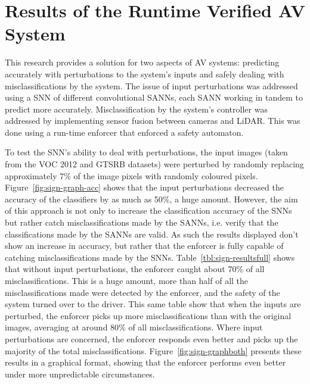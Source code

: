 \section{Results of the Runtime Verified AV System}

This research provides a solution for two aspects of \acf{AV} systems: predicting accurately with perturbations to the system's inputs and safely dealing with misclassifications by the system.
The issue of input perturbations was addressed using a \acf{SNN} of different convolutional \acfp{SANN}, each \ac{SANN} working in tandem to predict more accurately.
Misclassification by the system's controller was addressed by implementing sensor fusion between cameras and \ac{LiDAR}.
This was done using a run-time enforcer that enforced a safety automaton.

To test the \ac{SNN}'s ability to deal with perturbations, the input images (taken from the \ac{VOC} 2012 and \ac{GTSRB} datasets) were perturbed by randomly replacing approximately 7\% of the image pixels with randomly coloured pixels.
Figure~\ref{fig:sign-graph-acc} shows that the input perturbations decreased the accuracy of the classifiers by as much as 50\%, a huge amount.
However, the aim of this approach is not only to increase the classification accuracy of the \acp{SNN} but rather catch misclassifications made by the \acp{SANN}, i.e. verify that the classifications made by the \acp{SANN} are valid.
As such the results displayed don't show an increase in accuracy, but rather that the enforcer is fully capable of catching misclassifications made by the \acp{SNN}.
Table~\ref{tbl:sign-resultsfull} shows that without input perturbations, the enforcer caught about 70\% of all misclassifications. 
This is a huge amount, more than half of all the misclassifications made were detected by the enforcer, and the safety of the system turned over to the driver.
This same table show that when the inputs are perturbed, the enforcer picks up more misclassifications than with the original images, averaging at around 80\% of all misclassifications.
Where input perturbations are concerned, the enforcer responds even better and picks up the majority of the total misclassifications.
Figure~\ref{fig:sign-graphboth} presents these results in a graphical format, showing that the enforcer performs even better under more unpredictable circumstances.

